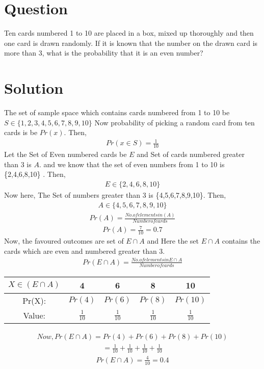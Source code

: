 \documentclass[journal,12pt,twocolumn]{IEEEtran}
\begin{document}
\section*{Question}
Ten cards numbered 1 to 10 are placed in
a box, mixed up thoroughly and then one
card is drawn randomly. If it is known that
the number on the drawn card is more than
3, what is the probability that it is an even
number?

\section*{Solution}
The set of sample space which contains cards numbered from 1 to 10 be $S \in \{1,2,3,4,5,6,7,8,9,10\}$
Now probability of picking a random card from ten cards is be $Pr(x)$. Then,
\begin{align}
Pr(x\in S )=\frac{1}{10}
\end{align}
Let the Set of Even numbered cards be $E$ and Set of cards numbered greater than 3 is $A$.
and we know that the set of even numbers from 1 to 10 is \{2,4,6,8,10\} . Then,
\begin{align}
E \in \{2,4,6,8,10\}    
\end{align}
Now here, The Set of numbers greater than 3 
is \{4,5,6,7,8,9,10\}. Then,
\begin{align}
    A \in \{4,5,6,7,8,9,10\}
\end{align}
\begin{align}
    Pr(A)=\frac{No. of elements in (A)}{Number of cards}
\end{align}
\begin{align}
\label{eq1}
    Pr(A)=\frac{7}{10}=0.7
\end{align}
Now, the favoured outcomes are set of $E \cap A$ and 
Here the set $E \cap A$ contains the cards which are even and numbered greater than 3.
\begin{align}
    Pr(E \cap A)=\frac{No. of elements in E\cap A}{Number of cards}
\end{align}

\begin{tabular}{|c|c|c|c|c|}
    \hline
    $X \in (E\cap A)$ &  4 & 6 & 8 & 10\\
    \hline
    Pr(X): & $Pr(4)$& $Pr(6)$& $Pr(8)$ & $Pr(10)$ \\
    \hline
    Value: & $\frac{1}{10}$  & $\frac{1}{10}$ &$\frac{1}{10}$ & $\frac{1}{10}$ \\
    \hline
\end{tabular} 
\begin{align}
   Now , Pr(E \cap A) = Pr(4)+Pr(6)+Pr(8)+Pr(10)
\end{align}
\begin{align}
   =\frac{1}{10}+\frac{1}{10}+\frac{1}{10}+\frac{1}{10}
\end{align}
\begin{align}
\label{eq2}
     Pr(E \cap A) =\frac{4}{10}=0.4
\end{align}
\end{document}
